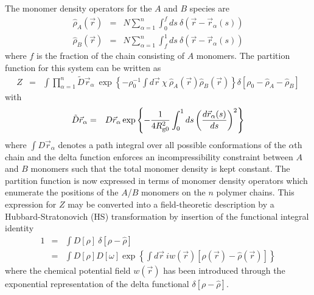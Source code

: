 \documentclass[onecolumn,amsmath,amssymb,floatfix]{elsart}
\begin{document}
The monomer density operators for the $A$ and $B$ species are
%
 \begin{eqnarray}
 {\hat \rho_A}({\vec r})
     & = & N \sum^{n}_{\alpha = 1}
           \int_0^f ds \ \delta({\vec r} - {\vec r}_{\alpha}(s)) \\
 {\hat \rho_B}({\vec r})
     & = & N \sum^{n}_{\alpha = 1}
           \int_f^1 ds \ \delta({\vec r} - {\vec r}_{\alpha}(s))
 \end{eqnarray}
%
where $f$ is the fraction of the chain consisting of $A$ monomers.
The partition function for this system can be written as
%
 \begin{eqnarray}
 \label{eqn_untransformed_Z}
  Z & = &
      \int \prod^{n}_{\alpha = 1} \tilde{D} {\vec r}_{\alpha} \
      \exp \left \lbrace
           - \rho_0^{-1} \int d{\vec r} \ \chi \ {\hat \rho_A}({\vec r}) {\hat \rho_B}({\vec r})
           \right \rbrace
      \delta[\rho_0 - {\hat \rho_A} - {\hat \rho_B}]
 \end{eqnarray}
%
with
%
 \begin{eqnarray}
  \tilde{D} {\vec r}_{\alpha}
    & = &
    D {\vec r}_{\alpha}
      \exp \left \lbrace
           - \frac{1}{4 R_{{\rm g}0}^2 } \int_0^1
           ds \left ( \frac{ d {\vec r}_{\alpha}(s)}{ds} \right )^{2}
           \right \rbrace
 \end{eqnarray}
where $\int D {\vec r}_\alpha$ denotes a path integral over
all possible conformations of the $\alpha$th chain and the delta
function enforces an incompressibility constraint between $A$
and $B$ monomers such that the total monomer density is kept
constant.
The partition function is now expressed in terms of
monomer density operators which enumerate the positions of the
$A$/$B$ monomers on the $n$ polymer chains.
This expression for
$Z$ may be converted into a field-theoretic description by a
Hubbard-Stratonovich (HS) transformation
by insertion of the functional integral identity
%
 \begin{eqnarray}
 \label{eqn_functional_identity}
  1
  & = &
  \int D[\rho] \ \delta[\rho - {\hat \rho} ] \\
  \nonumber
  & = &
  \int D[\rho] D[\omega]
    \exp
    \left \lbrace
     \int d{\vec r} \ i w({\vec r})
       \left [ \rho({\vec r}) - {\hat \rho}({\vec r}) \right ]
     \right \rbrace
 \end{eqnarray}
%
where the chemical potential field $w({\vec r})$ has been introduced through
the exponential representation of the delta functional
$\delta[\rho - {\hat \rho} ]$.
\end{document}
